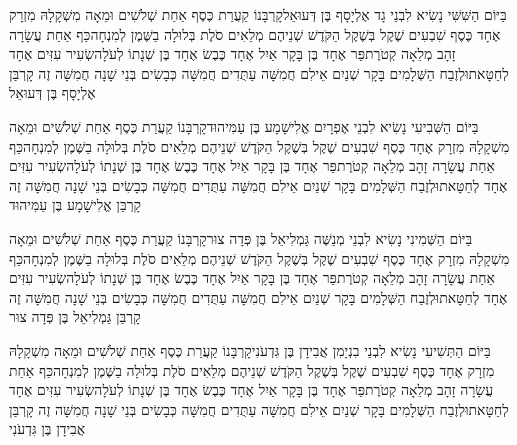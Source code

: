 \documentclass[../main/main.tex]{subfiles}
\begin{document}
\begin{multicols*}{\ncols}
בַּיּוֹם הַשִּׁשִּׁי נָשִׂיא לִבְנֵי גָד אֶלְיָסָף בֶּן דְּעוּאֵל\PreVerseSpace{}קָרְבָּנוֹ קַעֲרַת כֶּסֶף אַחַת שְׁלֹשִׁים וּמֵאָה מִשְׁקָלָהּ מִזְרָק אֶחָד כֶּסֶף שִׁבְעִים שֶׁקֶל בְּשֶׁקֶל הַקֹּדֶשׁ שְׁנֵיהֶם מְלֵאִים סֹלֶת בְּלוּלָה בַשֶּׁמֶן לְמִנְחָה\PreVerseSpace{}כַּף אַחַת עֲשָׂרָה זָהָב מְלֵאָה קְטֹרֶת\PreVerseSpace{}פַּר אֶחָד בֶּן בָּקָר אַיִל אֶחָד כֶּבֶשׂ אֶחָד בֶּן שְׁנָתוֹ לְעֹלָה\PreVerseSpace{}שְׂעִיר עִזִּים אֶחָד לְחַטָּאת\PreVerseSpace{}וּלְזֶבַח הַשְּׁלָמִים בָּקָר שְׁנַיִם אֵילִם חֲמִשָּׁה עַתֻּדִים חֲמִשָּׁה כְּבָשִׂים בְּנֵי שָׁנָה חֲמִשָּׁה זֶה קָרְבַּן אֶלְיָסָף בֶּן דְּעוּאֵל\OpenSection{}\par
{}בַּיּוֹם הַשְּׁבִיעִי נָשִׂיא לִבְנֵי אֶפְרָיִם אֱלִישָׁמָע בֶּן עַמִּיהוּד\PreVerseSpace{}קָרְבָּנוֹ קַעֲרַת כֶּסֶף אַחַת שְׁלֹשִׁים וּמֵאָה מִשְׁקָלָהּ מִזְרָק אֶחָד כֶּסֶף שִׁבְעִים שֶׁקֶל בְּשֶׁקֶל הַקֹּדֶשׁ שְׁנֵיהֶם מְלֵאִים סֹלֶת בְּלוּלָה בַשֶּׁמֶן לְמִנְחָה\PreVerseSpace{}כַּף אַחַת עֲשָׂרָה זָהָב מְלֵאָה קְטֹרֶת\PreVerseSpace{}פַּר אֶחָד בֶּן בָּקָר אַיִל אֶחָד כֶּבֶשׂ אֶחָד בֶּן שְׁנָתוֹ לְעֹלָה\PreVerseSpace{}שְׂעִיר עִזִּים אֶחָד לְחַטָּאת\PreVerseSpace{}וּלְזֶבַח הַשְּׁלָמִים בָּקָר שְׁנַיִם אֵילִם חֲמִשָּׁה עַתֻּדִים חֲמִשָּׁה כְּבָשִׂים בְּנֵי שָׁנָה חֲמִשָּׁה זֶה קָרְבַּן אֱלִישָׁמָע בֶּן עַמִּיהוּד\OpenSection{}\par
{}בַּיּוֹם הַשְּׁמִינִי נָשִׂיא לִבְנֵי מְנַשֶּׁה גַּמְלִיאֵל בֶּן פְּדָה צוּר\PreVerseSpace{}קָרְבָּנוֹ קַעֲרַת כֶּסֶף אַחַת שְׁלֹשִׁים וּמֵאָה מִשְׁקָלָהּ מִזְרָק אֶחָד כֶּסֶף שִׁבְעִים שֶׁקֶל בְּשֶׁקֶל הַקֹּדֶשׁ שְׁנֵיהֶם מְלֵאִים סֹלֶת בְּלוּלָה בַשֶּׁמֶן לְמִנְחָה\PreVerseSpace{}כַּף אַחַת עֲשָׂרָה זָהָב מְלֵאָה קְטֹרֶת\PreVerseSpace{}פַּר אֶחָד בֶּן בָּקָר אַיִל אֶחָד כֶּבֶשׂ אֶחָד בֶּן שְׁנָתוֹ לְעֹלָה\PreVerseSpace{}שְׂעִיר עִזִּים אֶחָד לְחַטָּאת\PreVerseSpace{}וּלְזֶבַח הַשְּׁלָמִים בָּקָר שְׁנַיִם אֵילִם חֲמִשָּׁה עַתֻּדִים חֲמִשָּׁה כְּבָשִׂים בְּנֵי שָׁנָה חֲמִשָּׁה זֶה קָרְבַּן גַּמְלִיאֵל בֶּן פְּדָה צוּר\OpenSection{}\par
{}בַּיּוֹם הַתְּשִׁיעִי נָשִׂיא לִבְנֵי בִנְיָמִן אֲבִידָן בֶּן גִּדְעֹנִי\PreVerseSpace{}קָרְבָּנוֹ קַעֲרַת כֶּסֶף אַחַת שְׁלֹשִׁים וּמֵאָה מִשְׁקָלָהּ מִזְרָק אֶחָד כֶּסֶף שִׁבְעִים שֶׁקֶל בְּשֶׁקֶל הַקֹּדֶשׁ שְׁנֵיהֶם מְלֵאִים סֹלֶת בְּלוּלָה בַשֶּׁמֶן לְמִנְחָה\PreVerseSpace{}כַּף אַחַת עֲשָׂרָה זָהָב מְלֵאָה קְטֹרֶת\PreVerseSpace{}פַּר אֶחָד בֶּן בָּקָר אַיִל אֶחָד כֶּבֶשׂ אֶחָד בֶּן שְׁנָתוֹ לְעֹלָה\PreVerseSpace{}שְׂעִיר עִזִּים אֶחָד לְחַטָּאת\PreVerseSpace{}וּלְזֶבַח הַשְּׁלָמִים בָּקָר שְׁנַיִם אֵילִם חֲמִשָּׁה עַתֻּדִים חֲמִשָּׁה כְּבָשִׂים בְּנֵי שָׁנָה חֲמִשָּׁה זֶה קָרְבַּן אֲבִידָן בֶּן גִּדְעֹנִי\OpenSection{}\par

\end{multicols*}
\end{document}
